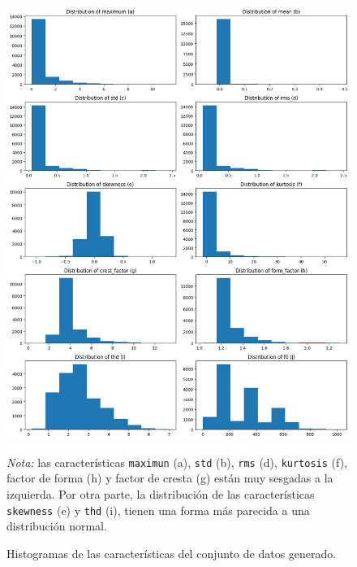 \documentclass[11pt,a4paper,spanish]{book}
\numberwithin{equation}{chapter}
\numberwithin{figure}{chapter}
\begin{document}
\begin{figure}[H]
    \caption{Histogramas de las características del conjunto de datos generado.}
    \centering
    \includegraphics[width=1\textwidth]{media/dataset-04/histogram.png}
    \label{fig:figHistogramsGen}
    \parbox{\textwidth}{\footnotesize \textit{Nota:} 
    las características \texttt{maximun} (a), \texttt{std} (b), \texttt{rms} (d), 
	\texttt{kurtosis} (f), factor de forma (h) y factor de cresta (g) 
	están muy sesgadas a la izquierda. 
	Por otra parte, la distribución de las características  
	\texttt{skewness} (e) y \texttt{thd} (i), 
	tienen una forma más parecida a una distribución normal.}
\end{figure}

\newpage
\end{document}

